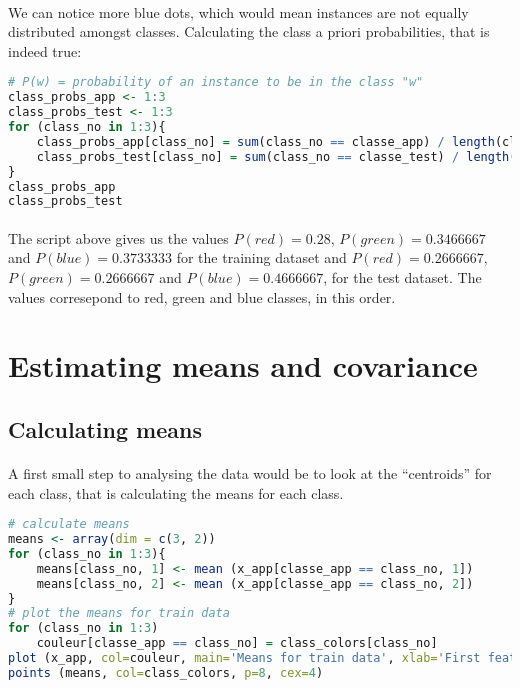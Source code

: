 \paragraph{}
We can notice more blue dots, which would mean instances are not equally distributed amongst classes.
Calculating the class a priori probabilities, that is indeed true:
\begin{lstlisting}[language=R, caption=A priori class probabilities]
# P(w) = probability of an instance to be in the class "w"
class_probs_app <- 1:3
class_probs_test <- 1:3
for (class_no in 1:3){
    class_probs_app[class_no] = sum(class_no == classe_app) / length(classe_app)
    class_probs_test[class_no] = sum(class_no == classe_test) / length(classe_test)
}
class_probs_app
class_probs_test
\end{lstlisting}

\paragraph{}
The script above gives us the values $P(red) = 0.28$, $P(green) = 0.3466667$ and $P(blue) = 0.3733333$ for the training dataset and $P(red) = 0.2666667$, $P(green) = 0.2666667$ and $P(blue) = 0.4666667$, for the test dataset.
The values corresepond to red, green and blue classes, in this order.


\section{Estimating means and covariance}

\subsection{Calculating means}

\paragraph{}
A first small step to analysing the data would be to look at the ``centroids'' for each class, that is calculating the means for each class.

\begin{lstlisting}[language=R, caption=Calculating means]
# calculate means
means <- array(dim = c(3, 2))
for (class_no in 1:3){
    means[class_no, 1] <- mean (x_app[classe_app == class_no, 1])
    means[class_no, 2] <- mean (x_app[classe_app == class_no, 2])
}
# plot the means for train data
for (class_no in 1:3)
    couleur[classe_app == class_no] = class_colors[class_no]
plot (x_app, col=couleur, main='Means for train data', xlab='First feature', ylab='Second feature')
points (means, col=class_colors, p=8, cex=4)
\end{lstlisting}

